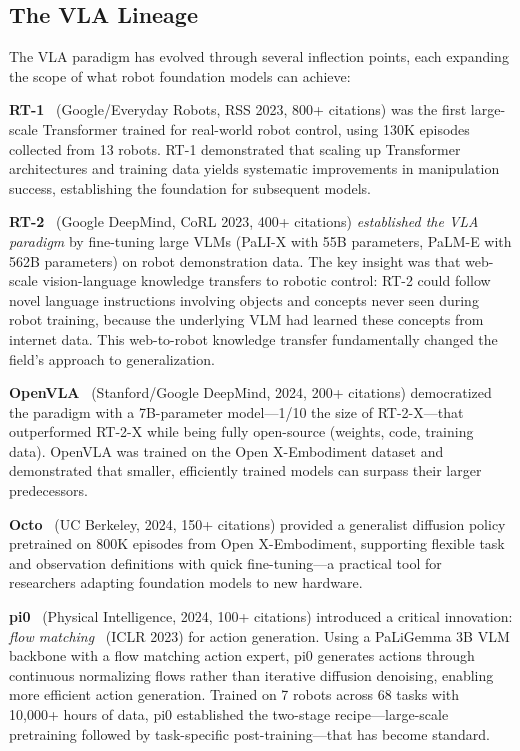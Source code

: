 \subsection{The VLA Lineage}

The VLA paradigm has evolved through several inflection points, each expanding the scope of what robot foundation models can achieve:

\textbf{RT-1}~\cite{brohan2023rt1} (Google/Everyday Robots, RSS 2023, 800+ citations) was the first large-scale Transformer trained for real-world robot control, using 130K episodes collected from 13 robots. RT-1 demonstrated that scaling up Transformer architectures and training data yields systematic improvements in manipulation success, establishing the foundation for subsequent models.

\textbf{RT-2}~\cite{brohan2023rt2} (Google DeepMind, CoRL 2023, 400+ citations) \emph{established the VLA paradigm} by fine-tuning large VLMs (PaLI-X with 55B parameters, PaLM-E with 562B parameters) on robot demonstration data. The key insight was that web-scale vision-language knowledge transfers to robotic control: RT-2 could follow novel language instructions involving objects and concepts never seen during robot training, because the underlying VLM had learned these concepts from internet data. This web-to-robot knowledge transfer fundamentally changed the field's approach to generalization.

\textbf{OpenVLA}~\cite{kim2024openvla} (Stanford/Google DeepMind, 2024, 200+ citations) democratized the paradigm with a 7B-parameter model---1/10 the size of RT-2-X---that outperformed RT-2-X while being fully open-source (weights, code, training data). OpenVLA was trained on the Open X-Embodiment dataset and demonstrated that smaller, efficiently trained models can surpass their larger predecessors.

\textbf{Octo}~\cite{octo2024} (UC Berkeley, 2024, 150+ citations) provided a generalist diffusion policy pretrained on 800K episodes from Open X-Embodiment, supporting flexible task and observation definitions with quick fine-tuning---a practical tool for researchers adapting foundation models to new hardware.

\textbf{pi0}~\cite{black2024pi0} (Physical Intelligence, 2024, 100+ citations) introduced a critical innovation: \emph{flow matching}~\cite{lipman2023flow} (ICLR 2023) for action generation. Using a PaLiGemma 3B VLM backbone with a flow matching action expert, pi0 generates actions through continuous normalizing flows rather than iterative diffusion denoising, enabling more efficient action generation. Trained on 7 robots across 68 tasks with 10{,}000+ hours of data, pi0 established the two-stage recipe---large-scale pretraining followed by task-specific post-training---that has become standard.

